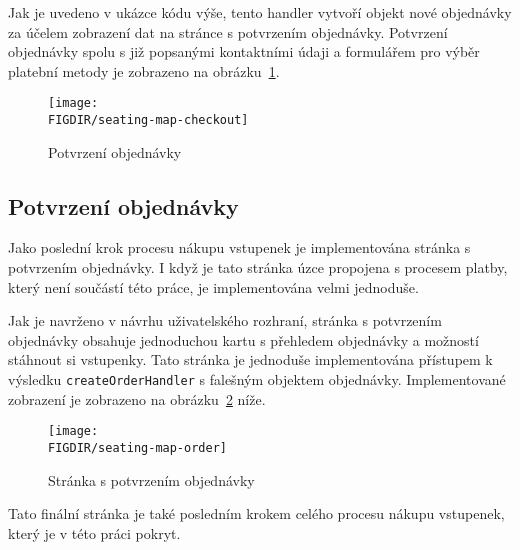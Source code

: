 Jak je uvedeno v ukázce kódu výše, tento handler vytvoří objekt nové objednávky za účelem zobrazení dat na stránce s potvrzením objednávky.
Potvrzení objednávky spolu s již popsanými kontaktními údaji a formulářem pro výběr platební metody je zobrazeno na obrázku~\ref{fig:seating-map-checkout}.

\begin{figure}[H]
	\centering
	\texttt{[image: \\FIGDIR/seating-map-checkout]}
	\caption{Potvrzení objednávky}
	\label{fig:seating-map-checkout}
\end{figure}

\subsection{Potvrzení objednávky}
\label{subsec:implementace-checkout-order-confirmation}
Jako poslední krok procesu nákupu vstupenek je implementována stránka s potvrzením objednávky.
I když je tato stránka úzce propojena s procesem platby, který není součástí této práce, je implementována velmi jednoduše.

Jak je navrženo v návrhu uživatelského rozhraní, stránka s potvrzením objednávky obsahuje jednoduchou kartu s přehledem objednávky a možností stáhnout si vstupenky.
Tato stránka je jednoduše implementována přístupem k výsledku \texttt{createOrderHandler} s falešným objektem objednávky.
Implementované zobrazení je zobrazeno na obrázku~\ref{fig:seating-map-order} níže.

\begin{figure}[H]
	\centering
	\texttt{[image: \\FIGDIR/seating-map-order]}
	\caption{Stránka s potvrzením objednávky}
	\label{fig:seating-map-order}
\end{figure}

Tato finální stránka je také posledním krokem celého procesu nákupu vstupenek, který je v této práci pokryt.
